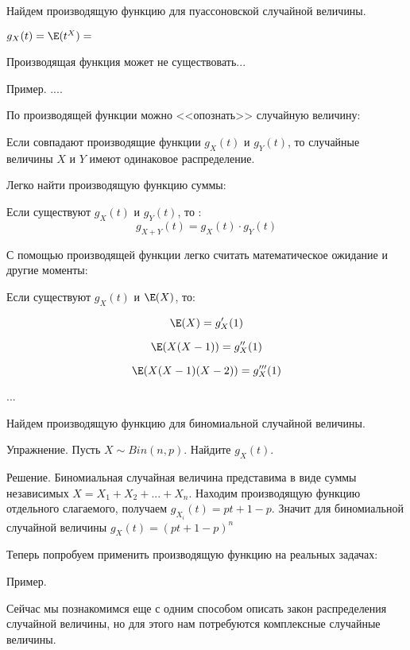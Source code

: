 {Найдем производящую функцию для пуассоновской случайной величины.

$ g_{X}(t)=\E(t^{X})= $



Производящая функция может не существовать...

Пример. ....



По производящей функции можно <<опознать>> случайную величину:
\begin{myth}
Если совпадают производящие функции $ g_{X}(t) $ и $ g_{Y}(t) $, то случайные величины $ X $ и $ Y $ имеют одинаковое распределение.
\end{myth}


Легко найти производящую функцию суммы:
\begin{myth}
Если существуют $ g_{X}(t) $ и $ g_{Y}(t) $, то :
\[g_{X+Y}(t)=g_{X}(t)\cdot g_{Y}(t)\]
\end{myth}


С помощью производящей функции легко считать математическое ожидание и другие моменты:
\begin{myth}
Если существуют $ g_{X}(t) $ и $ \E(X) $, то:

\[ \E(X)=g'_{X}(1) \]

\[ \E(X(X-1))=g''_{X}(1) \]

\[ \E(X(X-1)(X-2))=g'''_{X}(1) \]

...

\end{myth}


Найдем производящую функцию для биномиальной случайной величины.

Упражнение. Пусть $ X \sim Bin(n,p)$. Найдите $ g_{X}(t) $.

Решение. Биномиальная случайная величина представима в виде суммы независимых $ X=X_{1}+X_{2}+...+X_{n} $. Находим производящую функцию отдельного слагаемого, получаем $ g_{X_{i}}(t)=pt+1-p $. Значит для биномиальной случайной величины $ g_{X}(t)=(pt+1-p)^{n} $




Теперь попробуем применить производящую функцию на реальных задачах:

Пример. 






Сейчас мы познакомимся еще с одним способом описать закон распределения случайной величины, но для этого нам потребуются комплексные случайные величины.





}
